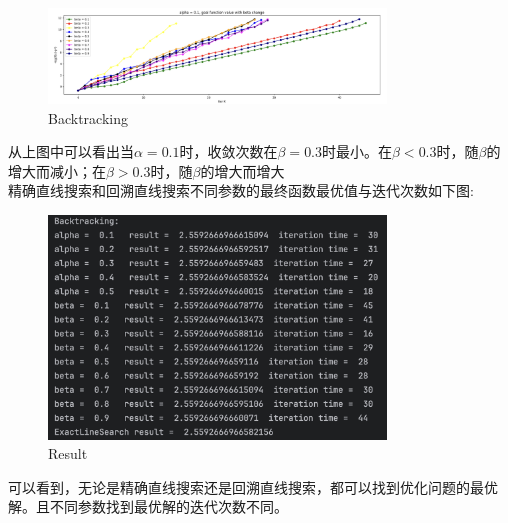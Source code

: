 \documentclass{article}
\begin{document}
\begin{figure}[H] 
    \centering 
    \includegraphics[width=0.8\textwidth]{Backtracking2.png}
    \caption*{Backtracking}
\end{figure}
从上图中可以看出当$\alpha = 0.1$时，收敛次数在$\beta = 0.3 $时最小。在$\beta < 0.3 $时，随$\beta$的增大而减小；在$\beta >0.3 $时，随$\beta$的增大而增大\\

精确直线搜索和回溯直线搜索不同参数的最终函数最优值与迭代次数如下图:
\begin{figure}[H] 
    \centering 
    \includegraphics[width=0.8\textwidth]{res.png}
    \caption*{Result}
\end{figure}
可以看到，无论是精确直线搜索还是回溯直线搜索，都可以找到优化问题的最优解。且不同参数找到最优解的迭代次数不同。

\newpage
{}
\end{document}
